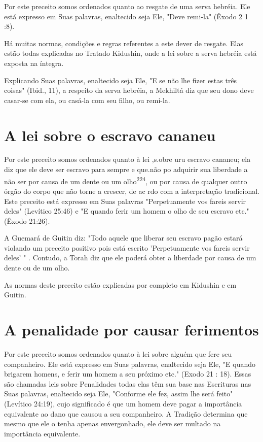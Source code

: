 \begin{itemize}
\begin{enumrate}
\begin{itemize}
\begin{itemize}
\begin{itemize}
Por este preceito somos ordenados quanto ao resgate de uma serva
hebréia. Ele está expresso em Suas palavras, enaltecido seja Ele, "Deve
remi-la" (Êxodo 2 1 :8).

Há muitas normas, condições e regras referentes a este dever de
res­gate. Elas estão todas explicadas no Tratado Kidushin, onde a lei
sobre a serva hebréia está exposta na íntegra.

Explicando Suas palavras, enaltecido seja Ele, "E se não lhe fizer
es­tas três coisas" (Ibid., 11), a respeito da serva hebréia, a Mekhiltá
diz que seu dono deve casar-se com ela, ou casá-la com seu filho, ou
remi-la.

\section{A lei sobre o escravo cananeu}

Por este preceito somos ordenados quanto à lei ,s.obre
uru escravo cananeu; ela diz que ele deve ser escravo para sempre e
que.não po adquirir sua liberdade a não ser por causa
de um dente ou um olho\textsuperscript{224}, ou por causa de qualquer
outro órgão do corpo que não torne a crescer, de ac rdo com a
interpretação tradicional. Este preceito está expresso em Suas palavras
"Perpe­tuamente vos fareis servir deles" (Levítico 25:46) e "E quando
ferir um homem o olho de seu escravo etc." (Êxodo 21:26).

A Guemará de Guitin diz: "Todo aquele que liberar seu escravo pa­gão
estará violando um preceito positivo pois está escrito 'Perpetuamente
vos fareis servir deles' " . Contudo, a Torah diz que ele poderá obter a
liberdade por causa de um dente ou de um olho.

As normas deste preceito estão explicadas por completo em Kidus­hin e em
Guitin.

\section{A penalidade por causar ferimentos}

Por este preceito somos ordenados quanto à lei sobre alguém que fere seu
companheiro. Ele está expresso em Suas palavras, enaltecido seja Ele, "E
quando brigarem homens, e ferir um homem a seu próximo etc." (Exodo 21 :
18). Essas são chamadas leis sobre Penalidades todas elas têm sua base
nas Escrituras nas Suas palavras, enaltecido seja Ele, "Conforme ele
fez, assim lhe será feito" (Levítico 24:19), cujo significado é que um
homem deve pagar a im­portância equivalente ao dano que causou a seu
companheiro. A Tradição de­termina que mesmo que ele o tenha apenas
envergonhado, ele deve ser multa­do na importância equivalente.


\end{itemize}
\end{itemize}
\end{itemize}
\end{enumrate}
\end{itemize}
